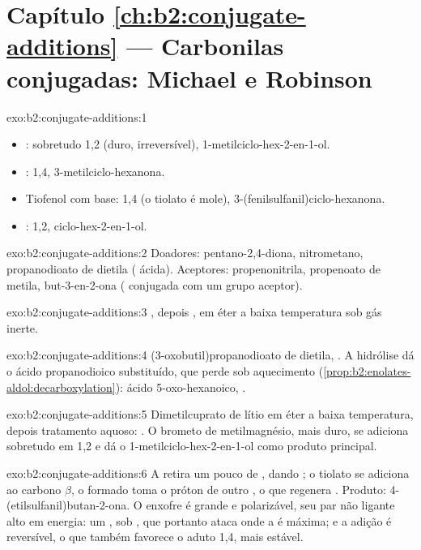 \section*{Capítulo \ref{ch:b2:conjugate-additions} --- Carbonilas conjugadas: Michael e Robinson}

\begin{solution}{exo:b2:conjugate-additions:1}
\begin{itemize}
  \item {}: sobretudo 1,2 (duro, irreversível), 1-metilciclo-hex-2-en-1-ol.
  \item {}: 1,4, 3-metilciclo-hexanona.
  \item Tiofenol com base: 1,4 (o tiolato é mole), 3-(fenilsulfanil)ciclo-hexanona.
  \item {}: 1,2, ciclo-hex-2-en-1-ol.
\end{itemize}
\end{solution}

\begin{solution}{exo:b2:conjugate-additions:2}
Doadores: pentano-2,4-diona, nitrometano, propanodioato de dietila ( ácida). Aceptores:
propenonitrila, propenoato de metila, but-3-en-2-ona ( conjugada com um grupo aceptor).
\end{solution}

\begin{solution}{exo:b2:conjugate-additions:3}
, depois , em éter a baixa
temperatura sob gás inerte.
\end{solution}

\begin{solution}{exo:b2:conjugate-additions:4}
(3-oxobutil)propanodioato de dietila, . A hidrólise dá o ácido
propanodioico substituído, que perde  sob aquecimento (\cref{prop:b2:enolates-aldol:decarboxylation}):
ácido 5-oxo-hexanoico, .
\end{solution}

\begin{solution}{exo:b2:conjugate-additions:5}
Dimetilcuprato de lítio em éter a baixa temperatura, depois tratamento aquoso: .
O brometo de metilmagnésio, mais duro, se adiciona sobretudo em 1,2 e dá o 1-metilciclo-hex-2-en-1-ol
como produto principal.
\end{solution}

\begin{solution}{exo:b2:conjugate-additions:6}
A  retira um pouco de , dando ; o tiolato se adiciona ao carbono $\beta$, o
 formado toma o próton de outro , o que regenera . Produto:
4-(etilsulfanil)butan-2-ona. O enxofre é grande e polarizável, seu par não ligante alto em energia: um
, sob , que portanto ataca onde a  é máxima; e a adição é
reversível, o que também favorece o aduto 1,4, mais estável.
\end{solution}

